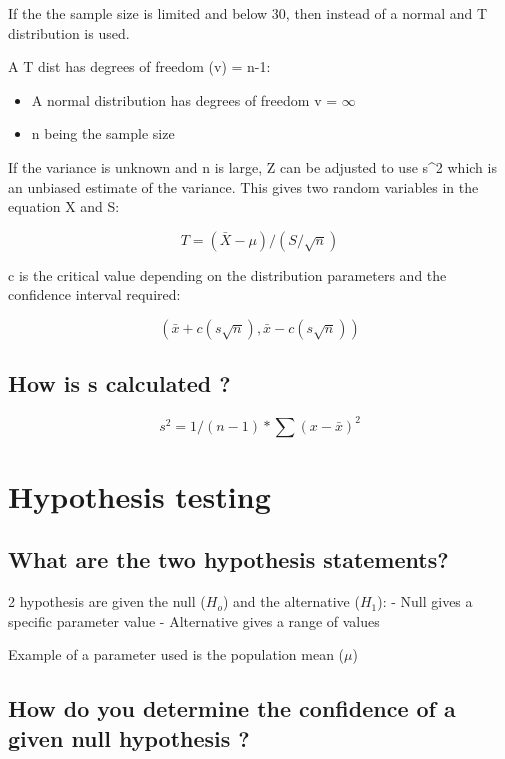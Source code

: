 \documentclass[11pt]{scrartcl} %
\begin{document}
If the the sample size is limited and below 30, then instead of a normal
and T distribution is used.

A T dist has degrees of freedom (v) = n-1:

\begin{itemize}
\item A normal distribution has degrees of freedom v = \(\infty\)
\item n being the sample size
\end{itemize}

If the variance is unknown and n is large, Z can be adjusted to use
s\^{}2 which is an unbiased estimate of the variance. This gives two
random variables in the equation X and S:

\begin{equation}
	T = (\bar{X} - \mu)/ (S/\sqrt{n})
\end{equation}

c is the critical value depending on the distribution parameters and the
confidence interval required:

\begin{equation}
	(\bar{x} + c(s\sqrt{n}),\bar{x} - c(s\sqrt{n}))
\end{equation}

\subsection{How is s calculated ?}

\begin{equation}
	s^2 = 1/(n-1) * \sum(x-\bar{x})^2
\end{equation}

\section{Hypothesis testing}

\subsection{What are the two hypothesis
statements?}

2 hypothesis are given the null (\(H_o\)) and the alternative (\(H_1\)):
- Null gives a specific parameter value - Alternative gives a range of
values

Example of a parameter used is the population mean (\(\mu\))

\subsection{How do you determine the confidence of a given null
hypothesis
?}
\end{document}
